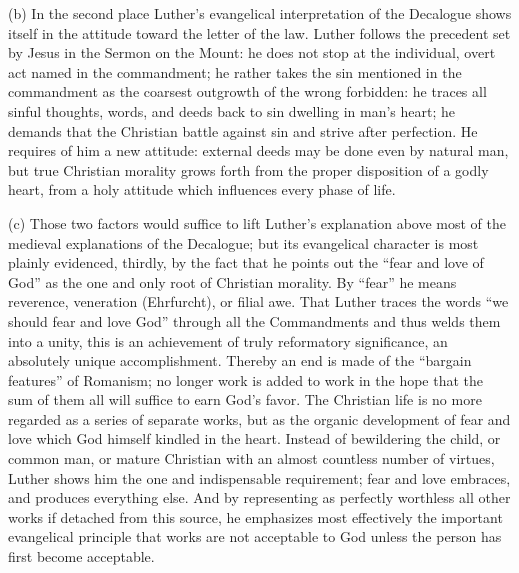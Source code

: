 (b) In the second place Luther’s evangelical interpretation of the Decalogue shows itself in the attitude toward the letter of the law. Luther follows the precedent set by Jesus in the Sermon on the Mount: he does not stop at the individual, overt act named in the commandment; he rather takes the sin mentioned in the commandment as the coarsest outgrowth of the wrong forbidden: he traces all sinful thoughts, words, and deeds back to sin dwelling in man’s heart; he demands that the Christian battle against sin and strive after perfection. He requires of him a new attitude: external deeds may be done even by natural man, but true Christian morality grows forth from the proper disposition of a godly heart, from a holy attitude which influences every phase of life.

(c) Those two factors would suffice to lift Luther’s explanation above most of the medieval explanations of the Decalogue; but its evangelical character is most plainly evidenced, thirdly, by the fact that he points out the “fear and love of God” as the one and only root of Christian morality. By “fear” he means reverence, veneration (Ehrfurcht), or filial
awe. That Luther traces the words “we should fear and love God” through all the Commandments and thus welds them into a unity, this is an achievement of truly reformatory significance, an absolutely unique accomplishment. Thereby an end is made of the “bargain features” of Romanism; no longer work is added to work in the hope that the sum of them all will suffice to earn God’s favor. The Christian life is no more regarded as a series of separate works, but as the organic development of fear and love which God himself kindled in the heart. Instead of bewildering the child, or common man, or mature Christian with an almost countless number of virtues, Luther shows him the one and indispensable requirement; fear and love embraces, and produces everything else. And by representing as perfectly worthless all other works if detached from this source, he emphasizes most effectively the important evangelical principle that works are not acceptable to God unless the person has first become acceptable.

